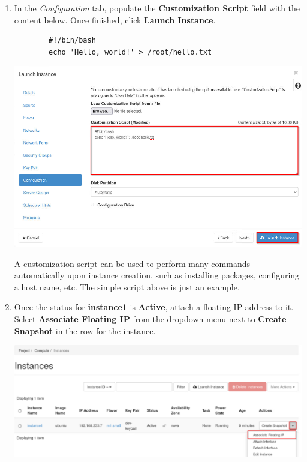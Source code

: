 \documentclass[letterpaper, 12pt]{article}
\begin{document}
\begin{enumerate}
    \item In the \textit{Configuration} tab, populate the \textbf{Customization Script} field with the content below.
    Once finished, click \textbf{Launch Instance}.
    \begin{lstlisting}
        #!/bin/bash
        echo 'Hello, world!' > /root/hello.txt
    \end{lstlisting}

    \begin{center}
        \includegraphics[width=\linewidth]{images/part2/step10.png}
    \end{center}

    \begin{tipbox}
        A customization script can be used to perform many commands automatically upon instance creation, such as installing packages, configuring a host name, etc.
        The simple script above is just an example.
    \end{tipbox}

    \item Once the status for \textbf{instance1} is \textbf{Active}, attach a floating IP address to it.
    Select \textbf{Associate Floating IP} from the dropdown menu next to \textbf{Create Snapshot} in the row for the instance.

    \begin{center}
        \includegraphics[width=\linewidth]{images/part2/step11.png}
    \end{center}


\end{enumerate}
\end{document}
